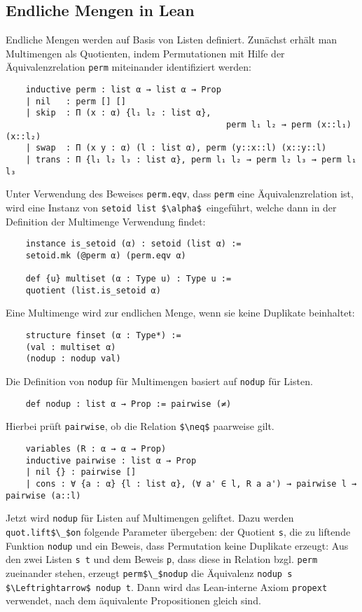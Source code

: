 \documentclass[a4paper,12pt]{scrartcl}
\begin{document}
	\subsection{Endliche Mengen in Lean}
	Endliche Mengen werden auf Basis von Listen definiert. Zunächst erhält man Multimengen als Quotienten, indem Permutationen mit Hilfe der Äquivalenzrelation \lstinline|perm| miteinander identifiziert werden:
	\begin{lstlisting}
	inductive perm : list α → list α → Prop
	| nil   : perm [] []
	| skip  : Π (x : α) {l₁ l₂ : list α},
											perm l₁ l₂ → perm (x::l₁) (x::l₂)
	| swap  : Π (x y : α) (l : list α), perm (y::x::l) (x::y::l)
	| trans : Π {l₁ l₂ l₃ : list α}, perm l₁ l₂ → perm l₂ l₃ → perm l₁ l₃
	\end{lstlisting}
	Unter Verwendung des Beweises \lstinline|perm.eqv|, dass \lstinline|perm| eine Äquivalenzrelation ist, wird eine Instanz von \lstinline|setoid list $\alpha$ |eingeführt, welche dann in der Definition der Multimenge Verwendung findet:
	\begin{lstlisting}
	instance is_setoid (α) : setoid (list α) :=
	setoid.mk (@perm α) (perm.eqv α)
	
	def {u} multiset (α : Type u) : Type u :=
	quotient (list.is_setoid α)
	\end{lstlisting}
	Eine Multimenge wird zur endlichen Menge, wenn sie keine Duplikate beinhaltet:
	\begin{lstlisting}
	structure finset (α : Type*) :=
	(val : multiset α)
	(nodup : nodup val)
	\end{lstlisting}
	Die Definition von \lstinline|nodup| für Multimengen basiert auf \lstinline|nodup| für Listen. 
	\begin{lstlisting}
	def nodup : list α → Prop := pairwise (≠)
	\end{lstlisting}
	Hierbei prüft \lstinline|pairwise|, ob die Relation \lstinline|$\neq$| paarweise gilt.
	\begin{lstlisting}
	variables (R : α → α → Prop)
	inductive pairwise : list α → Prop
	| nil {} : pairwise []
	| cons : ∀ {a : α} {l : list α}, (∀ a' ∈ l, R a a') → pairwise l → pairwise (a::l)
	\end{lstlisting}
	Jetzt wird \lstinline|nodup| für Listen auf Multimengen geliftet. Dazu werden \lstinline|quot.lift$\_$on| folgende Parameter übergeben: der Quotient \lstinline|s|, die zu liftende Funktion \lstinline|nodup| und ein Beweis, dass Permutation keine Duplikate erzeugt: Aus den zwei Listen \lstinline|s t| und dem Beweis \lstinline|p|, dass diese in Relation bzgl. \lstinline|perm| zueinander stehen, erzeugt \lstinline|perm$\_$nodup| die Äquivalenz \lstinline|nodup s $\Leftrightarrow$ nodup t|. Dann wird das Lean-interne Axiom \lstinline|propext| verwendet, nach dem äquivalente Propositionen gleich sind.
\end{document}
